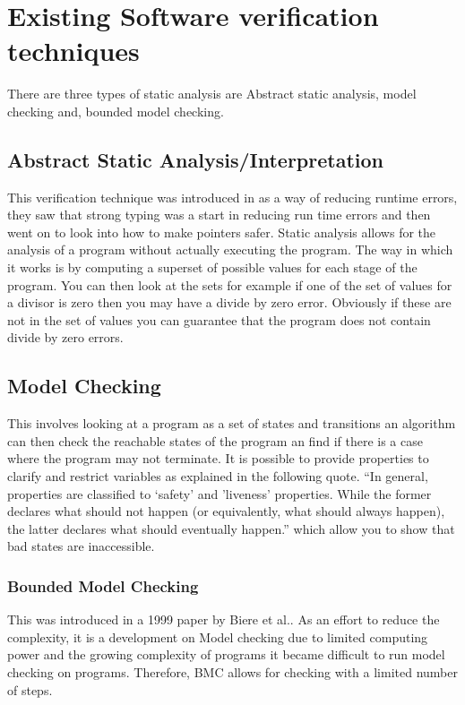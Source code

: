 \documentclass[a4paper,12pt]{scrartcl}
\begin{document}
	\section{Existing Software verification techniques}
	{
		There are three types of static analysis are Abstract static analysis, model checking and, bounded model checking.\cite{DSilva2008} 
		\subsection{Abstract Static Analysis/Interpretation}
		{
			This verification technique was introduced in \cite{Cousot1977} as a way of reducing runtime errors, they saw that strong typing was a start in reducing run time errors and then went on to look into how to make pointers safer. Static analysis allows for the analysis of a program without actually executing the program. The way in which it works is by computing a superset of possible values for each stage of the program. You can then look at the sets for example if one of the set of values for a divisor is zero then you may have a divide by zero error. Obviously if these are not in the set of values you can guarantee that the program does not contain divide by zero errors.
		}
		\subsection{Model Checking}
		{
			This involves looking at a program as a set of states and transitions an algorithm can then check the reachable states of the program an find if there is a case where the program may not terminate\cite{DSilva2008}. It is possible to provide properties to clarify and restrict variables as explained in the following quote. \enquote{In general, properties are classified to ‘safety’ and ’liveness’ properties. While the former declares what should not happen (or equivalently, what should always happen), the latter declares what should eventually happen.}\cite{Biere2003} which allow you to show that bad states are inaccessible.
			\subsubsection{Bounded Model Checking}
			{
				This was introduced in a 1999 paper by Biere et al.\cite{Biere1999}. As an effort to reduce the complexity, it is a development on Model checking due to limited computing power and the growing complexity of programs it became difficult to run model checking on programs. Therefore, BMC allows for checking with a limited number of steps.
			}
		}

	}
	
\end{document}
